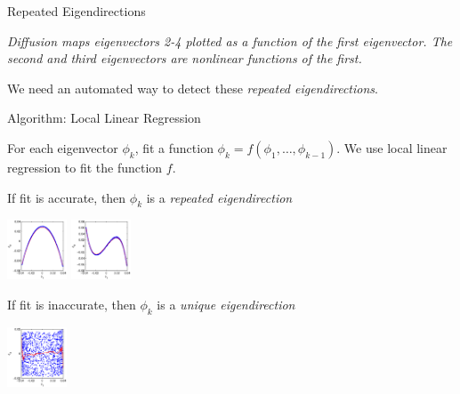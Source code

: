 \documentclass[12pt]{beamer}
\begin{document}
\begin{frame}{Repeated Eigendirections}
{\em \scriptsize Diffusion maps eigenvectors 2-4 plotted as a function of the first eigenvector. The second and third eigenvectors are nonlinear functions of the first. \par}

\vspace{0.1in}

We need an automated way to detect these {\em repeated eigendirections}.

\end{frame}

\begin{frame}{Algorithm: Local Linear Regression}

For each eigenvector $\phi_k$, fit a function $\phi_k = f(\phi_1, \dots, \phi_{k-1})$. 
%
We use local linear regression to fit the function $f$. 

\vspace{0.1in}

\begin{minipage}{0.45\textwidth}
{\small If fit is accurate, then $\phi_k$ is a {\em repeated eigendirection} \par}

\centering
\includegraphics[width=0.7in]{strip_corr_12_fitline}
\includegraphics[width=0.7in]{strip_corr_13_fitline}

\end{minipage}
%
\hfill 
%
\begin{minipage}{0.45\textwidth}
{\small If fit is inaccurate, then $\phi_k$ is a {\em unique eigendirection} \par}

\centering
\includegraphics[width=0.7in]{strip_corr_14_fitline}

\end{minipage}

\vspace{0.1in}


\end{frame}
\end{document}
